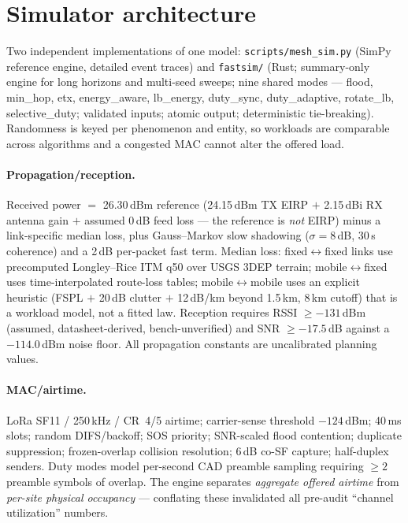 \documentclass[11pt]{article}
\newcommand{\code}[1]{\texttt{\small #1}}
\begin{document}
\section{Simulator architecture}\label{sec:sim}

Two independent implementations of one model: \code{scripts/mesh\_sim.py}
(SimPy reference engine, detailed event traces) and \code{fastsim/} (Rust;
summary-only engine for long horizons and multi-seed sweeps; nine shared
modes --- flood, min\_hop, etx, energy\_aware, lb\_energy, duty\_sync,
duty\_adaptive, rotate\_lb, selective\_duty; validated inputs; atomic output;
deterministic tie-breaking). Randomness is keyed per phenomenon and entity,
so workloads are comparable across algorithms and a congested MAC cannot
alter the offered load.

\paragraph{Propagation/reception.} Received power $=$ 26.30\,dBm reference
(24.15\,dBm TX EIRP $+$ 2.15\,dBi RX antenna gain $+$ assumed 0\,dB feed loss
--- the reference is \emph{not} EIRP) minus a link-specific median loss, plus
Gauss--Markov slow shadowing ($\sigma = 8$\,dB, 30\,s coherence) and a 2\,dB
per-packet fast term. Median loss: fixed$\leftrightarrow$fixed links use
precomputed Longley--Rice ITM q50 over USGS 3DEP terrain;
mobile$\leftrightarrow$fixed uses time-interpolated route-loss tables;
mobile$\leftrightarrow$mobile uses an explicit heuristic (FSPL $+$ 20\,dB
clutter $+$ 12\,dB/km beyond 1.5\,km, 8\,km cutoff) that is a workload model,
not a fitted law. Reception requires RSSI $\geq -131$\,dBm (assumed,
datasheet-derived, bench-unverified) and SNR $\geq -17.5$\,dB against a
$-114.0$\,dBm noise floor. All propagation constants are uncalibrated
planning values.

\paragraph{MAC/airtime.} LoRa SF11 / 250\,kHz / CR~4/5 airtime;
carrier-sense threshold $-124$\,dBm; 40\,ms slots; random DIFS/backoff; SOS
priority; SNR-scaled flood contention; duplicate suppression; frozen-overlap
collision resolution; 6\,dB co-SF capture; half-duplex senders. Duty modes
model per-second CAD preamble sampling requiring ${\geq}2$ preamble symbols
of overlap. The engine separates \emph{aggregate offered airtime} from
\emph{per-site physical occupancy} --- conflating these invalidated all
pre-audit ``channel utilization'' numbers.
\end{document}
